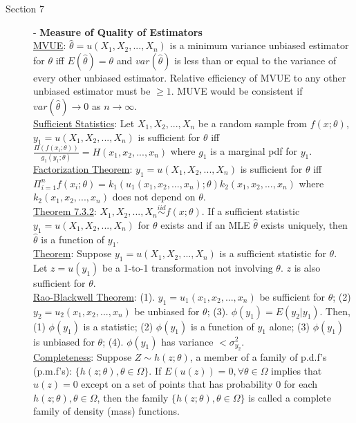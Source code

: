\documentclass[10pt,landscape]{article}
\begin{document}
\begin{multicols}{3}
	\begin{description}
		\item[Section 7] - \textbf{Measure of Quality of Estimators}\\
		\underline{MVUE}: $\hat{\theta} = u(X_1, X_2, ..., X_n)$ is a minimum variance unbiased estimator for $\theta$ iff $E(\hat{\theta}) = \theta$ and $var(\hat{\theta})$ is less than or equal to the variance of every other unbiased estimator. Relative efficiency of MVUE to any other unbiased estimator must be $\geq 1$. MUVE would be consistent if $var(\hat{\theta}) \rightarrow 0$ as $n\rightarrow\infty$. \\
		\underline{Sufficient Statistics}: Let $X_1, X_2, ..., X_n$ be a random sample from $f(x;\theta)$, $y_1 = u(X_1,X_2, ..., X_n)$ is sufficient for $\theta$ iff $\frac{\Pi(f(x_i;\theta))}{g_1(y_1;\theta)} = H(x_1, x_2, ..., x_n)$ where $g_1$ is a marginal pdf for $y_1$.\\
		\underline{Factorization Theorem}: $y_1 = u(X_1, X_2,..., X_n)$ is sufficient for $\theta$ iff $\Pi_{i=1}^n f(x_i; \theta) = k_1(u_1(x_1, x_2, ..., x_n); \theta) k_2(x_1, x_2, ..., x_n)$ where $k_2(x_1, x_2, ..., x_n)$ does not depend on $\theta$. \\
		\underline{Theorem 7.3.2}: $X_1, X_2, ..., X_n \overset{iid}{\sim} f(x; \theta)$. If a sufficient statistic $y_1 = u(X_1,X_2, ..., X_n)$ for $\theta$ exists and if an MLE $\hat{\theta}$ exists uniquely, then $\hat{\theta}$ is a function of $y_1$. \\
		\underline{Theorem}: Suppose $y_1 = u(X_1,X_2, ..., X_n)$ is a sufficient statistic for $\theta$. Let $z = u(y_1)$ be a 1-to-1 transformation not involving $\theta$. $z$ is also sufficient for $\theta$. \\
		\underline{Rao-Blackwell Theorem}: (1). $y_1 = u_1(x_1, x_2, ..., x_n)$ be sufficient for $\theta$; (2) $y_2 = u_2(x_1, x_2, ..., x_n)$ be unbiased for $\theta$; (3). $\phi(y_1) = E(y_2|y_1)$. Then, (1) $\phi(y_1)$ is a statistic; (2) $\phi(y_1)$ is a function of $y_1$ alone; (3) $\phi(y_1)$ is unbiased for $\theta$; (4). $\phi(y_1)$  has variance $< \sigma_{y_2}^2$. \\
		\underline{Completeness}:  Suppose $Z \sim h(z; \theta)$, a member of a family of p.d.f's (p.m.f's): $\{h(z;\theta), \theta	\in \Omega \}$. If $E(u(z)) = 0, \forall \theta \in \Omega$ implies that $u(z) = 0$ except on a set of points that has probability 0 for each $h(z; \theta), \theta	\in \Omega$, then the family $\{h(z;\theta), \theta	\in \Omega \}$ is called a complete family of density (mass) functions. \\

\end{description}
\end{multicols}
\end{document}
